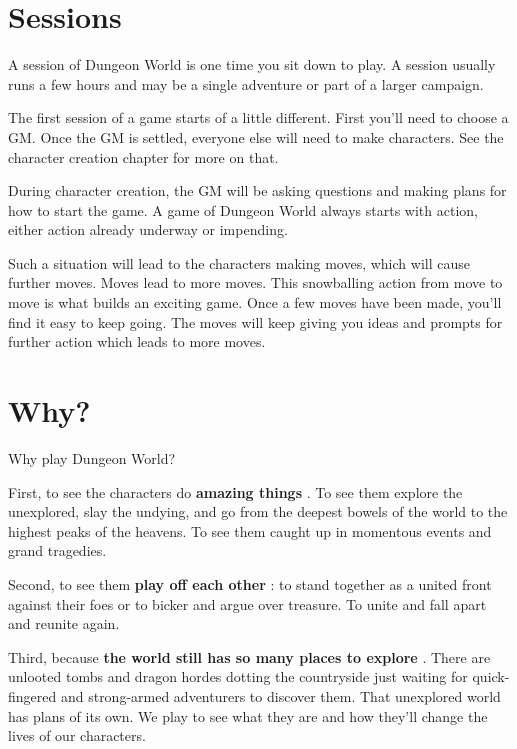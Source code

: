        
\section{Sessions}   
       

A session of Dungeon World is one time you sit down to play. A session usually runs a few hours and may be a single adventure or part of a larger campaign.

       

The first session of a game starts of a little different. First you'll need to choose a GM. Once the GM is settled, everyone else will need to make characters. See the character creation chapter for more on that.

       

During character creation, the GM will be asking questions and making plans for how to start the game. A game of Dungeon World always starts with action, either action already underway or impending.

       

Such a situation will lead to the characters making moves, which will cause further moves. Moves lead to more moves. This snowballing action from move to move is what builds an exciting game. Once a few moves have been made, you'll find it easy to keep going. The moves will keep giving you ideas and prompts for further action which leads to more moves.

       
\section{Why?}  
       

Why play Dungeon World?

       

First, to see the characters do {\bf amazing things} . To see them explore the unexplored, slay the undying, and go from the deepest bowels of the world to the highest peaks of the heavens. To see them caught up in momentous events and grand tragedies.

       

Second, to see them {\bf play off each other} : to stand together as a united front against their foes or to bicker and argue over treasure. To unite and fall apart and reunite again.

       

Third, because {\bf the world still has so many places to explore} . There are unlooted tombs and dragon hordes dotting the countryside just waiting for quick-fingered and strong-armed adventurers to discover them. That unexplored world has plans of its own. We play to see what they are and how they'll change the lives of our characters.

                
